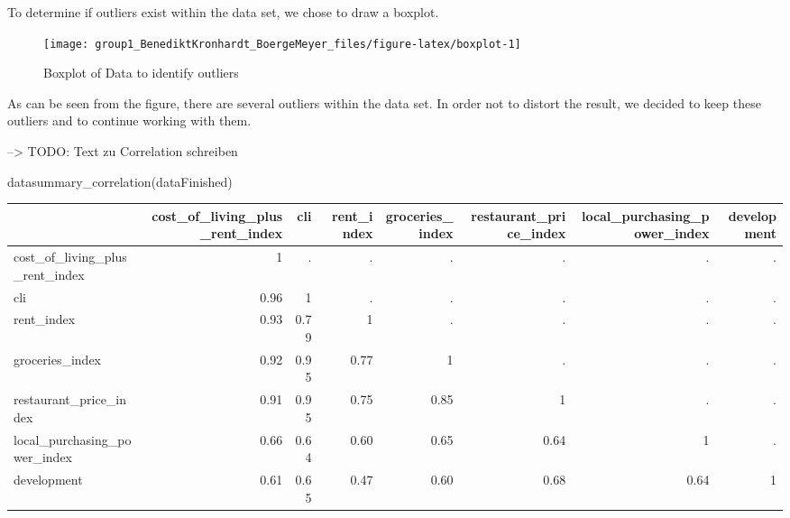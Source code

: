 \documentclass[
  11pt,
  a4paper,
  twoside]{scrbook}
\newenvironment{Shaded}{\begin{snugshade}}{\end{snugshade}}
\newcommand{\FunctionTok}[1]{\textcolor[rgb]{0.00,0.00,0.00}{#1}}
\newcommand{\NormalTok}[1]{#1}
\begin{document}
To determine if outliers exist within the data set, we chose to draw a boxplot.

\begin{figure}

{\centering \texttt{[image: group1\_BenediktKronhardt\_BoergeMeyer\_files/figure-latex/boxplot-1]} 

}

\caption{Boxplot of Data to identify outliers}\label{fig:boxplot}
\end{figure}

As can be seen from the figure, there are several outliers within the data set. In order not to distort the result, we decided to keep these outliers and to continue working with them.

--\textgreater{} TODO: Text zu Correlation schreiben

\linespread{1}

\begin{Shaded}
\begin{Highlighting}[]
\FunctionTok{datasummary\_correlation}\NormalTok{(dataFinished)}
\end{Highlighting}
\end{Shaded}

\linespread{1}

\begin{table}
\centering
\begin{tabular}[t]{lrrrrrrr}
\toprule
  & cost\_of\_living\_plus\_rent\_index & cli & rent\_index & groceries\_index & restaurant\_price\_index & local\_purchasing\_power\_index & development\\
\midrule
cost\_of\_living\_plus\_rent\_index & 1 & . & . & . & . & . & .\\
cli & \num{.96} & 1 & . & . & . & . & .\\
rent\_index & \num{.93} & \num{.79} & 1 & . & . & . & .\\
groceries\_index & \num{.92} & \num{.95} & \num{.77} & 1 & . & . & .\\
restaurant\_price\_index & \num{.91} & \num{.95} & \num{.75} & \num{.85} & 1 & . & .\\
local\_purchasing\_power\_index & \num{.66} & \num{.64} & \num{.60} & \num{.65} & \num{.64} & 1 & .\\
development & \num{.61} & \num{.65} & \num{.47} & \num{.60} & \num{.68} & \num{.64} & 1\\
\bottomrule
\end{tabular}
\end{table}
\end{document}
